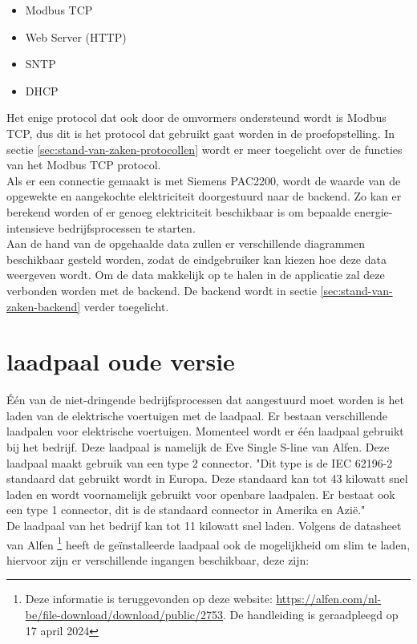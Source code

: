\begin{itemize}
    \item Modbus TCP
    \item Web Server (HTTP)
    \item SNTP
    \item DHCP
\end{itemize}

Het enige protocol dat ook door de omvormers ondersteund wordt is Modbus TCP, dus dit is het protocol dat gebruikt gaat worden in de proefopstelling. In sectie \ref{sec:stand-van-zaken-protocollen} wordt er meer toegelicht over de functies van het Modbus TCP protocol.\\

Als er een connectie gemaakt is met Siemens PAC2200, wordt de waarde van de opgewekte en aangekochte elektriciteit doorgestuurd naar de backend. Zo kan er berekend worden of er genoeg elektriciteit beschikbaar is om bepaalde energie-intensieve bedrijfsprocessen te starten.\\

Aan de hand van de opgehaalde data zullen er verschillende diagrammen beschikbaar gesteld worden, zodat de eindgebruiker kan kiezen hoe deze data weergeven wordt. Om de data makkelijk op te halen in de applicatie zal deze verbonden worden met de backend. De backend wordt in sectie \ref{sec:stand-van-zaken-backend} verder toegelicht.

\section{laadpaal oude versie}
\label{sec:stand-van-zaken-laadpaal-oud}

Één van de niet-dringende bedrijfsprocessen dat aangestuurd moet worden is het laden van de elektrische voertuigen met de laadpaal. Er bestaan verschillende laadpalen voor elektrische voertuigen. Momenteel wordt er één laadpaal gebruikt bij het bedrijf. Deze laadpaal is namelijk de Eve Single S-line van Alfen. Deze laadpaal maakt gebruik van een type 2 connector. "Dit type is de IEC 62196-2 standaard dat gebruikt wordt in Europa. Deze standaard kan tot 43 kilowatt snel laden en wordt voornamelijk gebruikt voor openbare laadpalen. Er bestaat ook een type 1 connector, dit is de standaard connector in Amerika en Azië." \autocite{HEMAVATHI2022105013} \\

De laadpaal van het bedrijf kan tot 11 kilowatt snel laden. Volgens de datasheet van Alfen \footnote{Deze informatie is teruggevonden op deze website: \url{https://alfen.com/nl-be/file-download/download/public/2753}. De handleiding is geraadpleegd op 17 april 2024} heeft de geïnstalleerde laadpaal ook de mogelijkheid om slim te laden, hiervoor zijn er verschillende ingangen beschikbaar, deze zijn:

